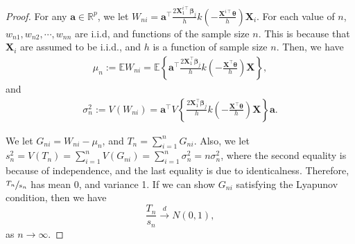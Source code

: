 \documentclass[12pt]{article}
\newcommand{\bs}{ \boldsymbol}
\newcommand{\lt}{\left}
\newcommand{\rt}{\right}
\begin{document}
\begin{proof}
	For any  $\bs{a} \in \mathbb{R}^p$, we let $W_{ni}=\bs{a^{\intercal}}\frac{2\bs{X}_{1}^{i\intercal}\bs{\beta}_j}{h}k\lt(-\frac{\bs{X}^{i\intercal}\bs{\theta}}{h}\rt)\bs{X}_{i}$. For each value of $n$, $w_{n1},w_{n2},\cdots,w_{nn}$ are i.i.d, and functions of the sample size $n$. This is because that $\bs{X}_{i}$ are assumed to be i.i.d., and $h$ is a function of sample
	size $n$. Then, we have
	\begin{gather*}
	\mu_{n}:=\mathbb{E}W_{ni}=\mathbb{E}\lt\{\bs{a^{\intercal}}\frac{2\bs{X}_{1}^{\intercal}\bs{\beta}_j}{h}k\lt(-\frac{\bs{X}^{\intercal}\bs{\theta}}{h}\rt)\bs{X}\rt\},
	\end{gather*}
	and 
	\begin{gather*}
	\sigma_{n}^{2}:=V(W_{ni})=\bs{\bs{a}^{\intercal}}V\lt\{\frac{2\bs{X}_{1}^{\intercal}\bs{\beta}_j}{h}k\lt(-\frac{\bs{X}^{\intercal}\bs{\theta}}{h}\rt)\bs{X}\rt\}\bs{a}.
	\end{gather*}
	
	We let $G_{ni}=W_{ni}-\mu_{\ensuremath{n}}$, and $T_{n}=\sum_{i=1}^{n}G_{ni}$. Also, we let $s_{n}^{2}=V(T_{n})=\sum_{i=1}^{n}V(G_{ni})=\sum_{i=1}^{n}\sigma_{n}^{2}=n\sigma_{n}^{2}$, where the second equality is because of independence, and the last equality is due to identicalness. Therefore, $\sfrac{T_{n}}{s_{n}}$ has mean 0, and variance 1.  If we can show $G_{ni}$ satisfying the Lyapunov condition, then
	we have
	\[
	\frac{T_{n}}{s_{n}}\overset{d}{\to}N(0,1),
	\]
	as $n \to \infty$.
	

\end{proof}
\end{document}
